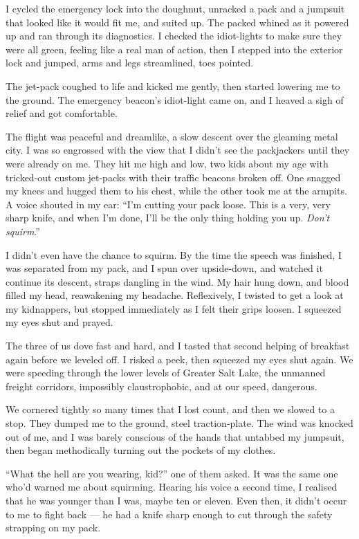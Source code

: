 I cycled the emergency lock into the doughnut, unracked a pack and
a jumpsuit that looked like it would fit me, and suited up. The
packed whined as it powered up and ran through its diagnostics. I
checked the idiot-lights to make sure they were all green, feeling
like a real man of action, then I stepped into the exterior lock
and jumped, arms and legs streamlined, toes pointed.

The jet-pack coughed to life and kicked me gently, then started
lowering me to the ground. The emergency beacon's idiot-light came
on, and I heaved a sigh of relief and got comfortable.

The flight was peaceful and dreamlike, a slow descent over the
gleaming metal city. I was so engrossed with the view that I didn't
see the packjackers until they were already on me. They hit me high
and low, two kids about my age with tricked-out custom jet-packs
with their traffic beacons broken off. One snagged my knees and
hugged them to his chest, while the other took me at the armpits. A
voice shouted in my ear:
``I'm cutting your pack loose. This is a very, very sharp knife, and when I'm 
done, I'll be the only thing holding you up. \emph{Don't squirm}.''

I didn't even have the chance to squirm. By the time the speech was
finished, I was separated from my pack, and I spun over
upside-down, and watched it continue its descent, straps dangling
in the wind. My hair hung down, and blood filled my head,
reawakening my headache. Reflexively, I twisted to get a look at my
kidnappers, but stopped immediately as I felt their grips loosen. I
squeezed my eyes shut and prayed.

The three of us dove fast and hard, and I tasted that second
helping of breakfast again before we leveled off. I risked a peek,
then squeezed my eyes shut again. We were speeding through the
lower levels of Greater Salt Lake, the unmanned freight corridors,
impossibly claustrophobic, and at our speed, dangerous.

We cornered tightly so many times that I lost count, and then we
slowed to a stop. They dumped me to the ground, steel
traction-plate. The wind was knocked out of me, and I was barely
conscious of the hands that untabbed my jumpsuit, then began
methodically turning out the pockets of my clothes.

``What the hell are you wearing, kid?'' one of them asked. It was
the same one who'd warned me about squirming. Hearing his voice a
second time, I realised that he was younger than I was, maybe ten
or eleven. Even then, it didn't occur to me to fight back --- he
had a knife sharp enough to cut through the safety strapping on my
pack.


